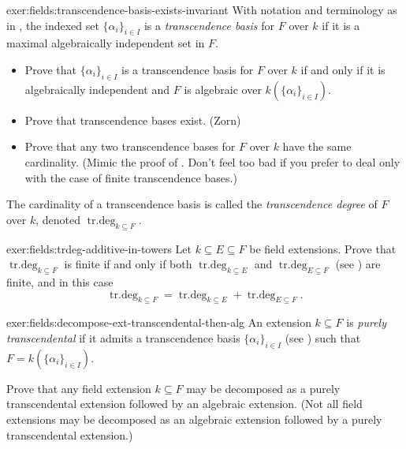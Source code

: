 \begin{exer}{}{exer:fields:transcendence-basis-exists-invariant}
  With notation and terminology as in
  , the indexed
  set ${\{\alpha_i\}}_{i \in I}$ is a \emph{transcendence basis} for
  $F$ over $k$ if it is a maximal algebraically independent set in
  $F$.
  \begin{itemize}
  \item Prove that ${\{\alpha_i\}}_{i \in I}$ is a transcendence basis
    for $F$ over $k$ if and only if it is algebraically independent
    and $F$ is algebraic over $k({\{\alpha_i\}}_{i \in I})$.
  \item Prove that transcendence bases exist. (Zorn)
  \item Prove that any two transcendence bases for $F$ over $k$ have
    the same cardinality. (Mimic the proof of . Don't
    feel too bad if you prefer to deal only with the case of finite
    transcendence bases.)
  \end{itemize}
  The cardinality of a transcendence basis is called the
  \emph{transcendence degree} of $F$ over $k$, denoted
  $\operatorname{tr.deg}_{k \subseteq F}$.
\end{exer}

\begin{exer}{}{exer:fields:trdeg-additive-in-towers}
  Let $k \subseteq E \subseteq F$ be field extensions. Prove that
  $\operatorname{tr.deg}_{k \subseteq F}$ is finite if and only if
  both $\operatorname{tr.deg}_{k \subseteq E}$ and
  $\operatorname{tr.deg}_{E \subseteq F}$ (see
  ) are finite,
  and in this case
  \[
    \operatorname{tr.deg}_{k \subseteq F} = \operatorname{tr.deg}_{k
      \subseteq E} + \operatorname{tr.deg}_{E \subseteq F}.
  \]
\end{exer}

\begin{exer}{}{exer:fields:decompose-ext-transcendental-then-alg}
  An extension $k \subseteq F$ is \emph{purely transcendental} if it
  admits a transcendence basis ${\{\alpha_i\}}_{i \in I}$ (see
  ) such that
  $F = k({\{\alpha_i\}}_{i \in I})$.

  Prove that any field extension $k \subseteq F$ may be decomposed as
  a purely transcendental extension followed by an algebraic
  extension. (Not all field extensions may be decomposed as an
  algebraic extension followed by a purely transcendental extension.)
\end{exer}

